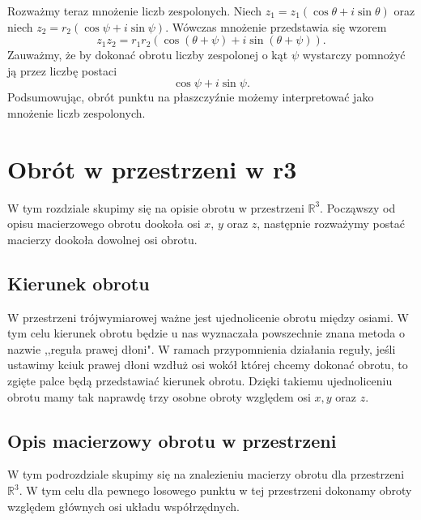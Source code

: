 \documentclass[a4paper,twoside,11pt,reqno]{mwrep}
\theoremstyle{plain} \newtheorem{twr}{Twierdzenie}
\theoremstyle{plain} \newtheorem{lem}{Lemat}
\theoremstyle{definition} \newtheorem{defi}{Definicja}
\theoremstyle{remark} \newtheorem*{wni}{Wniosek}
\theoremstyle{definition} \newtheorem{uwaga}{Uwaga}
\theoremstyle{definition}\newtheorem{prz}{Przykład}
\begin{document}
Rozważmy teraz mnożenie liczb zespolonych. Niech $z_1 = z_1(\cos\theta +i\sin\theta)$ oraz 
niech $z_2 = r_2(\cos\psi +i\sin\psi)$.
Wówczas mnożenie przedstawia się wzorem
$$z_1z_2=r_1r_2(\cos(\theta+\psi) +i\sin(\theta+\psi)).$$
Zauważmy, że by dokonać obrotu liczby zespolonej o kąt $\psi$ 
wystarczy pomnożyć ją przez liczbę postaci $$\cos\psi +i\sin\psi.$$
Podsumowując, obrót punktu na płaszczyźnie możemy interpretować jako mnożenie liczb zespolonych.

\section{Obrót w przestrzeni w r3}

W tym rozdziale skupimy się na opisie obrotu w
przestrzeni $\mathbb{R}^3$. 
Począwszy od opisu macierzowego obrotu dookoła osi $x$, $y$ oraz $z$, następnie
rozważymy postać macierzy dookoła dowolnej osi obrotu.

\subsection{Kierunek obrotu}

W przestrzeni trójwymiarowej ważne jest ujednolicenie obrotu między osiami.
W tym celu kierunek obrotu będzie u nas wyznaczała powszechnie znana metoda
o nazwie ,,reguła prawej dłoni". W ramach przypomnienia działania reguły, jeśli ustawimy
kciuk prawej dłoni wzdłuż osi wokół której chcemy
dokonać obrotu, to zgięte palce będą przedstawiać kierunek obrotu.
Dzięki takiemu ujednoliceniu obrotu mamy tak naprawdę trzy osobne obroty względem osi $x,y$
oraz $z$.

\subsection{Opis macierzowy obrotu w przestrzeni}
W tym podrozdziale skupimy się na znalezieniu macierzy 
obrotu dla przestrzeni $\mathbb{R}^3$. W tym celu 
dla pewnego losowego punktu w tej przestrzeni dokonamy obroty względem głównych 
osi układu współrzędnych. 
\end{document}
